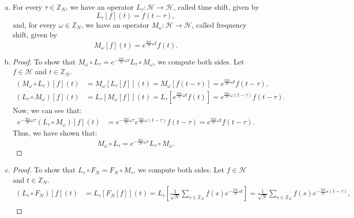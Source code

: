 \documentclass{article}
\def\zz{{\mathbb Z}}
\begin{document}
\begin{enumerate}[(a)]
    \item For every $\tau \in \zz_N$, we have an operator $L_\tau : \mathscr{H} \to \mathscr{H}$, called time shift, given by
    \begin{equation*}
        L_\tau[f](t) = f(t - \tau),
    \end{equation*}
    and, for every $\omega \in \zz_N$, we have an operator $M_\omega : \mathscr{H} \to \mathscr{H}$, called frequency shift, given by
    \begin{equation*}
        M_\omega[f](t) = e^{\frac{2 \pi i}{N} \omega t} f(t).
    \end{equation*}

    \item \begin{proof}
        To show that $M_\omega \circ L_\tau = e^{-\frac{2 \pi i}{N} \omega \tau} L_\tau \circ M_\omega$, we compute both sides. Let $f \in \mathscr{H}$ and $t \in \zz_N$.
        \begin{align*}
            (M_\omega \circ L_\tau)[f](t) &= M_\omega[L_\tau[f]](t) = M_\omega[f(t - \tau)] = e^{\frac{2 \pi i}{N} \omega t} f(t - \tau), \\
            (L_\tau \circ M_\omega)[f](t) &= L_\tau[M_\omega[f]](t) = L_\tau[e^{\frac{2 \pi i}{N} \omega t} f(t)] = e^{\frac{2 \pi i}{N} \omega (t - \tau)} f(t - \tau).
        \end{align*}
        Now, we can see that:
        \begin{align*}
            e^{-\frac{2 \pi i}{N} \omega \tau} (L_\tau \circ M_\omega)[f](t) &= e^{-\frac{2 \pi i}{N} \omega \tau} e^{\frac{2 \pi i}{N} \omega (t - \tau)} f(t - \tau) = e^{\frac{2 \pi i}{N} \omega t} f(t - \tau).
        \end{align*}
        Thus, we have shown that:
        \begin{equation*}
            M_\omega \circ L_\tau = e^{-\frac{2 \pi i}{N} \omega \tau} L_\tau \circ M_\omega.
        \end{equation*}
    \end{proof}
    \item \begin{proof}
        To show that $L_\tau \circ F_N = F_N \circ M_\tau$, we compute both sides. Let $f \in \mathscr{H}$ and $t \in \zz_N$.
        \begin{align*}
            (L_\tau \circ F_N)[f](t) &= L_\tau[F_N[f]](t) = L_\tau\left[\frac{1}{\sqrt{N}} \sum_{s \in \zz_N} f(s) e^{-\frac{2 \pi i}{N} s t}\right] = \frac{1}{\sqrt{N}} \sum_{s \in \zz_N} f(s) e^{-\frac{2 \pi i}{N} s (t - \tau)}, \\

\end{align*}
\end{proof}
\end{enumerate}
\end{document}
